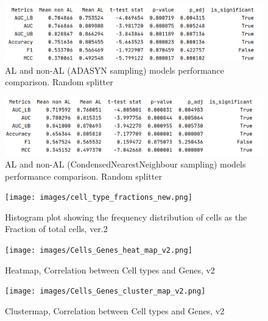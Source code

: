 \documentclass[a4paper,10pt]{article}
\begin{document}
\begin{figure}[3]
    \includegraphics[keepaspectratio=true, scale=0.33]{images/ADASYN.png}
    \caption{AL and non-AL (ADASYN sampling) models performance comparison. Random splitter}
    \label{fig:3}
\end{figure}

\begin{figure}[4]
    \centering
    \includegraphics[keepaspectratio=true, scale=0.33]{images/CondensedNearestNeighbour.png}
    \caption{AL and non-AL (CondensedNearestNeighbour sampling) models performance comparison. Random splitter}
    \label{fig:4}
\end{figure}

\begin{figure}[5]
    \centering
    \texttt{[image: images/cell\_type\_fractions\_new.png]}
    \caption{Histogram plot showing the frequency distribution of cells as the Fraction of total cells, ver.2}
    \label{fig:5}
\end{figure}

\begin{figure}[6]
    \centering
    \texttt{[image: images/Cells\_Genes\_heat\_map\_v2.png]}
    \caption{Heatmap, Correlation between Cell types and Genes, v2}
    \label{fig:6}
\end{figure}

\begin{figure}[7]
    \centering
    \texttt{[image: images/Cells\_Genes\_cluster\_map\_v2.png]}
    \caption{Clustermap, Correlation between Cell types and Genes, v2}
    \label{fig:7}
\end{figure}

\medskip



\end{document}
